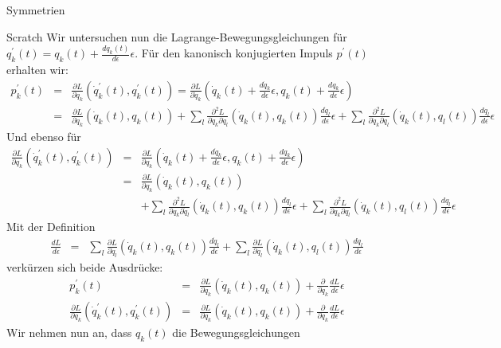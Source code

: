 \documentclass[a4paper,fleqn]{article}
\numberwithin{equation}{section}
\begin{document}
\begin{section}{Symmetrien}
\begin{subsection}{Scratch}
Wir untersuchen nun die Lagrange-Bewegungsgleichungen für $q^\prime_k(t)=q_k(t)+\frac{dq_k(t)}{d\epsilon}\epsilon$. Für den kanonisch konjugierten Impuls $p^\prime(t)$ erhalten wir:
\begin{eqnarray*}
p_k^\prime(t) &=& \frac{\partial L}{\partial \dot{q}_k}(\dot{q}^\prime_k(t),q^\prime_k(t))
=\frac{\partial L}{\partial \dot{q}_k}\left(\dot{q}_k(t)+\frac{d\dot{q}_k}{d\epsilon}\epsilon,q_k(t)+\frac{dq_k}{d\epsilon}\epsilon\right)\\
&=& \frac{\partial L}{\partial \dot{q}_k}\left(\dot{q}_k(t),q_k(t)\right)
+\sum_l\frac{\partial^2 L}{\partial \dot{q}_k\partial \dot{q}_l}\left(\dot{q}_k(t),q_k(t)\right)\frac{d\dot{q}_l}{d\epsilon}\epsilon
+\sum_l\frac{\partial^2 L}{\partial \dot{q}_k\partial q_l}\left(\dot{q}_k(t),q_l(t)\right)\frac{dq_l}{d\epsilon}\epsilon
\end{eqnarray*}
Und ebenso für
\begin{eqnarray*}
\frac{\partial L}{\partial q_k}(\dot{q}^\prime_k(t),q^\prime_k(t))
&=&\frac{\partial L}{\partial q_k}\left(\dot{q}_k(t)+\frac{d\dot{q}_k}{d\epsilon}\epsilon,q_k(t)+\frac{dq_k}{d\epsilon}\epsilon\right)\\
&=& \frac{\partial L}{\partial q_k}\left(\dot{q}_k(t),q_k(t)\right)\\
&&+\sum_l\frac{\partial^2 L}{\partial q_k\partial \dot{q}_l}\left(\dot{q}_k(t),q_k(t)\right)\frac{d\dot{q}_l}{d\epsilon}\epsilon
+\sum_l\frac{\partial^2 L}{\partial q_k\partial q_l}\left(\dot{q}_k(t),q_l(t)\right)\frac{dq_l}{d\epsilon}\epsilon
\end{eqnarray*}
Mit der Definition
\begin{eqnarray*}
\frac{dL}{d\epsilon}&=&\sum_l\frac{\partial L}{\partial \dot{q}_l}\left(\dot{q}_k(t),q_k(t)\right)\frac{d\dot{q}_l}{d\epsilon}
+\sum_l\frac{\partial L}{\partial q_l}\left(\dot{q}_k(t),q_l(t)\right)\frac{dq_l}{d\epsilon}
\end{eqnarray*}
verkürzen sich beide Ausdrücke:
\begin{eqnarray*}
p_k^\prime(t) &=& \frac{\partial L}{\partial \dot{q}_k}\left(\dot{q}_k(t),q_k(t)\right)
+\frac{\partial}{\partial \dot{q}_k}\frac{dL}{d\epsilon}\epsilon\\
\frac{\partial L}{\partial q_k}(\dot{q}^\prime_k(t),q^\prime_k(t))
&=& \frac{\partial L}{\partial q_k}\left(\dot{q}_k(t),q_k(t)\right)
+\frac{\partial}{\partial q_k}\frac{dL}{d\epsilon}\epsilon
\end{eqnarray*}
Wir nehmen nun an, dass $q_k(t)$ die Bewegungsgleichungen

\end{subsection}
\end{section}
\end{document}
